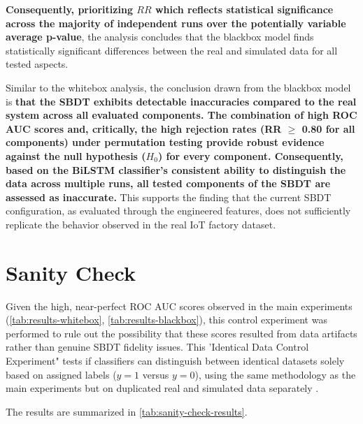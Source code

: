 \textbf{Consequently, prioritizing $RR$ which reflects statistical significance across the majority of independent runs over the potentially variable average p-value}, the analysis concludes that the blackbox model finds statistically significant differences between the real and simulated data for all tested aspects.

Similar to the whitebox analysis, the conclusion drawn from the blackbox model is \textbf{that the SBDT exhibits detectable inaccuracies compared to the real system across all evaluated components. The combination of high ROC AUC scores and, critically, the high rejection rates (RR $\ge$ 0.80 for all components) under permutation testing provide robust evidence against the null hypothesis ($H_0$) for every component. Consequently, based on the BiLSTM classifier's consistent ability to distinguish the data across multiple runs, all tested components of the SBDT are assessed as inaccurate.} This supports the finding that the current SBDT configuration, as evaluated through the engineered features, does not sufficiently replicate the behavior observed in the real IoT factory dataset.

\section{Sanity Check}
\label{sec:sanity-check}

Given the high, near-perfect ROC AUC scores observed in the main experiments (\autoref{tab:results-whitebox}, \autoref{tab:results-blackbox}), this control experiment was performed to rule out the possibility that these scores resulted from data artifacts rather than genuine SBDT fidelity issues. This 'Identical Data Control Experiment" tests if classifiers can distinguish between identical datasets solely based on assigned labels ($y=1$ versus $y=0$), using the same methodology as the main experiments but on duplicated real and simulated data separately \autocite{adebayo2018sanity}.

The results are summarized in \autoref{tab:sanity-check-results}.

